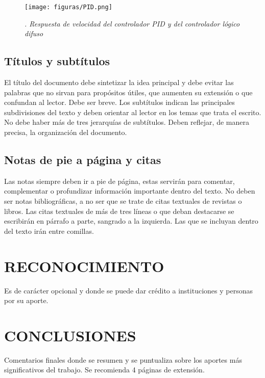 \documentclass[10pt]{article}
\begin{document}
\begin{multicols}{2}
\begin{figure}[H]
    \centering
    \texttt{[image: figuras/PID.png]}
    \caption{\justifying \textit{. Respuesta de velocidad del controlador PID y del controlador lógico difuso}}
    \label{fig:PID Fuzzy}
\end{figure}

\subsection{Títulos y subtítulos}

El título del documento debe sintetizar la idea principal y debe evitar las palabras que no sirvan para propósitos útiles, que aumenten su extensión o que confundan al lector. Debe ser breve. Los subtítulos indican las principales subdivisiones del texto y deben orientar al lector en los temas que trata el escrito. No debe haber más de tres jerarquías de subtítulos. Deben reflejar, de manera precisa, la organización del documento.

\subsection{Notas de pie a página y citas}

Las notas siempre deben ir a pie de página, estas servirán para comentar, complementar o profundizar información importante dentro del texto. No deben ser notas bibliográficas, a no ser que se trate de citas textuales de revistas o libros. Las citas textuales de más de tres líneas o que deban destacarse se escribirán en párrafo a parte, sangrado a la izquierda. Las que se incluyan dentro del texto irán entre comillas.

\section{RECONOCIMIENTO}

Es de carácter opcional y donde se puede dar crédito a instituciones y personas por su aporte.

\section{CONCLUSIONES}

Comentarios finales donde se resumen y se puntualiza sobre los aportes más significativos del trabajo. Se recomienda 4 páginas de extensión.

\begin{center}
    \printbibliography[title={\fontsize{10}{12}\selectfont REFERENCIAS}, heading=bibintoc]
\end{center}


\end{multicols}
\end{document}
